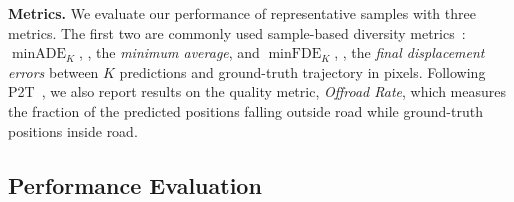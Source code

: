 \documentclass[10pt,twocolumn,letterpaper]{article}
\begin{document}
\textbf{Metrics. } We evaluate our performance of representative samples with three metrics. The first two are commonly used sample-based diversity metrics~\cite{gupta2018social}: $\operatorname{minADE}_{K}$, \ie, the \textit{minimum average}, and $\operatorname{minFDE}_{K}$, \ie, the \textit{final displacement errors} between $K$ predictions and ground-truth trajectory in pixels. Following P2T~\cite{deo2020trajectory}, we also report results on the quality metric, \textit{Offroad Rate}, which measures the fraction of the predicted positions falling outside road while ground-truth positions inside road. 

\begin{table}
    \centering
{}
	\vspace{-0.2cm}
	\caption{Comparison with state-of-the-art methods on the entire SDD dataset (above) and its \textit{TrajNet} split (below) in predicting short-term 4.8-second future.}

	\label{tab:result}
\end{table}


\subsection{Performance Evaluation}
\end{document}
